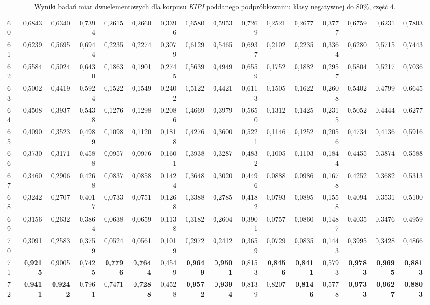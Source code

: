 \begin{table}[htp!]
\begin{adjustwidth}{-2cm}{}
\begin{tabular}{ l | *{15}{| r}}
60	&	0,6843	&	0,6340	&	0,7394	&	0,2615	&	0,2660	&	0,3396	&	0,6580	&	0,5953	&	0,7269	&	0,2521	&	0,2677	&	0,3777	&	0,6759	&	0,6231	&	0,7803	\\
61	&	0,6239	&	0,5695	&	0,6944	&	0,2235	&	0,2274	&	0,3079	&	0,6129	&	0,5465	&	0,6937	&	0,2102	&	0,2235	&	0,3364	&	0,6280	&	0,5715	&	0,7443	\\
62	&	0,5584	&	0,5024	&	0,6430	&	0,1863	&	0,1901	&	0,2745	&	0,5639	&	0,4949	&	0,6559	&	0,1752	&	0,1882	&	0,2957	&	0,5804	&	0,5217	&	0,7036	\\
63	&	0,5002	&	0,4419	&	0,5924	&	0,1522	&	0,1549	&	0,2402	&	0,5122	&	0,4421	&	0,6113	&	0,1505	&	0,1622	&	0,2608	&	0,5402	&	0,4799	&	0,6645	\\
64	&	0,4508	&	0,3937	&	0,5438	&	0,1276	&	0,1298	&	0,2086	&	0,4669	&	0,3979	&	0,5650	&	0,1312	&	0,1425	&	0,2315	&	0,5052	&	0,4444	&	0,6277	\\
65	&	0,4090	&	0,3523	&	0,4989	&	0,1098	&	0,1120	&	0,1818	&	0,4276	&	0,3600	&	0,5221	&	0,1146	&	0,1252	&	0,2056	&	0,4734	&	0,4136	&	0,5916	\\
66	&	0,3730	&	0,3171	&	0,4588	&	0,0957	&	0,0976	&	0,1601	&	0,3938	&	0,3287	&	0,4832	&	0,1005	&	0,1103	&	0,1844	&	0,4455	&	0,3874	&	0,5588	\\
67	&	0,3460	&	0,2906	&	0,4268	&	0,0837	&	0,0858	&	0,1424	&	0,3648	&	0,3020	&	0,4496	&	0,0888	&	0,0986	&	0,1678	&	0,4252	&	0,3682	&	0,5313	\\
68	&	0,3242	&	0,2707	&	0,4017	&	0,0733	&	0,0751	&	0,1268	&	0,3388	&	0,2785	&	0,4182	&	0,0793	&	0,0895	&	0,1558	&	0,4094	&	0,3531	&	0,5100	\\
69	&	0,3156	&	0,2632	&	0,3864	&	0,0638	&	0,0659	&	0,1138	&	0,3182	&	0,2604	&	0,3901	&	0,0757	&	0,0860	&	0,1487	&	0,4035	&	0,3476	&	0,4959	\\
70	&	0,3091	&	0,2583	&	0,3759	&	0,0524	&	0,0561	&	0,1019	&	0,2972	&	0,2412	&	0,3659	&	0,0729	&	0,0835	&	0,1443	&	0,3995	&	0,3428	&	0,4866	\\
71	&	\textbf{0,9215}	&	0,9005	&	0,7425	&	\textbf{0,7796}	&	\textbf{0,7644}	&	0,4549	&	\textbf{0,9649}	&	\textbf{0,9501}	&	0,8153	&	\textbf{0,8456}	&	\textbf{0,8411}	&	0,5793	&	\textbf{0,9783}	&	\textbf{0,9695}	&	\textbf{0,8813}	\\
72	&	\textbf{0,9411}	&	\textbf{0,9242}	&	0,7961	&	0,7471	&	\textbf{0,7288}	&	0,4528	&	\textbf{0,9572}	&	\textbf{0,9394}	&	0,8139	&	0,8207	&	\textbf{0,8146}	&	0,5778	&	\textbf{0,9733}	&	\textbf{0,9627}	&	\textbf{0,8803}	\\
	\bottomrule
\end{tabular}
 \end{adjustwidth}
\caption[Wyniki badań miar dwuelementowych dla korpusu \emph{KIPI} poddanego podpróbkowaniu klasy negatywnej do 80\%, część 4]{Wyniki badań miar dwuelementowych dla korpusu \emph{KIPI} poddanego podpróbkowaniu klasy negatywnej do 80\%, część 4.}
\label{KIPI_subsampled_20_part_4}
\end{table}

